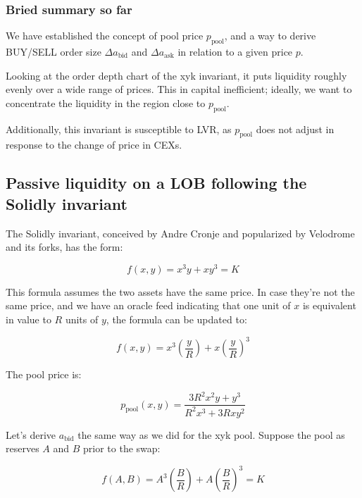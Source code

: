 \documentclass{article}
\begin{document}
\subsubsection{Bried summary so far}

We have established the concept of pool price $p_{\mathrm{pool}}$, and a way to derive BUY/SELL order size $\Delta a_{\mathrm{bid}}$ and $\Delta a_{\mathrm{ask}}$ in relation to a given price $p$.

Looking at the order depth chart of the xyk invariant, it puts liquidity roughly evenly over a wide range of prices. This in capital inefficient; ideally, we want to concentrate the liquidity in the region close to $p_{\mathrm{pool}}$.

Additionally, this invariant is susceptible to LVR, as $p_{\mathrm{pool}}$ does not adjust in response to the change of price in CEXs.

\subsection{Passive liquidity on a LOB following the Solidly invariant}

The Solidly invariant, conceived by Andre Cronje\supercite{andrecronjetwitter} and popularized by Velodrome\supercite{velodrome} and its forks,\supercite{aerodrome} has the form:

\begin{equation}
  f(x, y) = x^3 y + x y^3 = K
\end{equation}

This formula assumes the two assets have the same price. In case they're not the same price, and we have an oracle feed indicating that one unit of $x$ is equivalent in value to $R$ units of $y$, the formula can be updated to:

\begin{equation}
  f(x, y) = x^3 \left( \frac{y}{R} \right) + x \left( \frac{y}{R} \right)^3
\end{equation}

The pool price is:

\begin{equation}
  p_{\mathrm{pool}}(x, y) = \frac{3 R^2 x^2 y + y^3}{R^2 x^3 + 3 R x y^2}
\end{equation}

Let's derive $a_{\mathrm{bid}}$ the same way as we did for the xyk pool. Suppose the pool as reserves $A$ and $B$ prior to the swap:

\begin{equation}
  f(A, B) = A^3 \left( \frac{B}{R} \right) + A \left( \frac{B}{R} \right)^3 = K
\end{equation}
\end{document}
